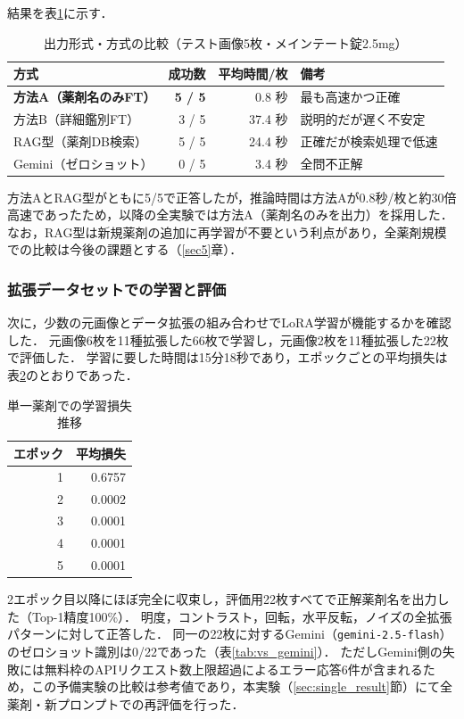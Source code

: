 \documentclass[dvipdfmx]{jsarticle}
\begin{document}
結果を表\ref{tab:method_compare}に示す．

\begin{table}[htbp]
\centering
\caption{出力形式・方式の比較（テスト画像5枚・メインテート錠2.5mg）}
\label{tab:method_compare}
\begin{tabular}{lrrl}
\hline
方式 & 成功数 & 平均時間/枚 & 備考 \\
\hline
\textbf{方法A（薬剤名のみFT）} & \textbf{5 / 5} & 0.8 秒 & 最も高速かつ正確 \\
方法B（詳細鑑別FT） & 3 / 5 & 37.4 秒 & 説明的だが遅く不安定 \\
RAG型（薬剤DB検索） & 5 / 5 & 24.4 秒 & 正確だが検索処理で低速 \\
Gemini（ゼロショット） & 0 / 5 & 3.4 秒 & 全問不正解 \\
\hline
\end{tabular}
\end{table}

方法AとRAG型がともに5/5で正答したが，推論時間は方法Aが0.8秒/枚と約30倍高速であったため，以降の全実験では方法A（薬剤名のみを出力）を採用した．
なお，RAG型は新規薬剤の追加に再学習が不要という利点があり，全薬剤規模での比較は今後の課題とする（\ref{sec5}章）．

\subsubsection{拡張データセットでの学習と評価}

次に，少数の元画像とデータ拡張の組み合わせでLoRA学習が機能するかを確認した．
元画像6枚を11種拡張した66枚で学習し，元画像2枚を11種拡張した22枚で評価した．
学習に要した時間は15分18秒であり，エポックごとの平均損失は表\ref{tab:loss_meinte}のとおりであった．

\begin{table}[htbp]
\centering
\caption{単一薬剤での学習損失推移}
\label{tab:loss_meinte}
\begin{tabular}{rr}
\hline
エポック & 平均損失 \\
\hline
1 & 0.6757 \\
2 & 0.0002 \\
3 & 0.0001 \\
4 & 0.0001 \\
5 & 0.0001 \\
\hline
\end{tabular}
\end{table}

2エポック目以降にほぼ完全に収束し，評価用22枚すべてで正解薬剤名を出力した（Top-1精度100\%）．
明度，コントラスト，回転，水平反転，ノイズの全拡張パターンに対して正答した．
同一の22枚に対するGemini（\texttt{gemini-2.5-flash}）のゼロショット識別は0/22であった（表\ref{tab:vs_gemini}）．
ただしGemini側の失敗には無料枠のAPIリクエスト数上限超過によるエラー応答6件が含まれるため，この予備実験の比較は参考値であり，本実験（\ref{sec:single_result}節）にて全薬剤・新プロンプトでの再評価を行った．
\end{document}
